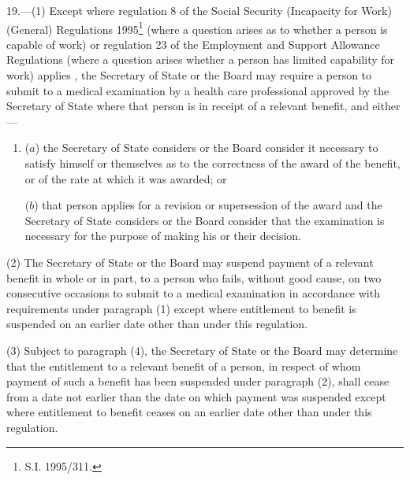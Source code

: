 \documentclass[12pt,a4paper]{article}
\begin{document}
19.—(1) Except where regulation 8 of the Social Security (Incapacity for Work) (General) Regulations 1995\footnote{\frenchspacing S.I. 1995/311.} 
(where a question arises as to whether a person is capable of work)
or regulation 23 of the Employment and Support Allowance Regulations (where a question arises whether a person has limited capability for work) applies%
, the Secretary of State 
or the Board  %
may require a person to submit to a medical examination by a 
health care professional approved by the Secretary of State  %
where that person is in receipt of a relevant benefit, and either—
\begin{enumerate}\item[]
($a$) the Secretary of State considers 
or the Board consider  %
it necessary to satisfy himself 
or themselves  %
as to the correctness of the award of the benefit, or of the rate at which it was awarded; or

($b$) that person applies for a revision or supersession of the award and the Secretary of State considers 
or the Board consider  %
that the examination is necessary for the purpose of making his 
or their  %
decision.
\end{enumerate}

(2) The Secretary of State 
or the Board  %
may suspend payment of a relevant benefit in whole or in part, to a person who fails, without good cause, on two consecutive occasions to submit to a medical examination in accordance with requirements under paragraph (1) except where entitlement to benefit is suspended on an earlier date other than under this regulation.

(3) Subject to paragraph (4), the Secretary of State 
or the Board  %
may determine that the entitlement to a relevant benefit of a person, in respect of whom payment of such a benefit has been suspended under paragraph (2), shall cease from a date not earlier than the date on which payment was suspended except where entitlement to benefit ceases on an earlier date other than under this regulation.
\end{document}
